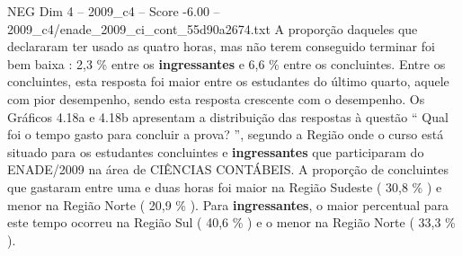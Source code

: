 \begin{textsample}{NEG Dim 4 – 2009\_c4 – Score -6.00 – 2009\_c4/enade\_2009\_ci\_cont\_55d90a2674.txt}
A proporção daqueles que declararam ter usado as quatro horas, mas não terem conseguido terminar foi bem baixa : 2,3 \% entre os \textbf{ingressantes} e 6,6 \% entre os concluintes.
Entre os concluintes, esta resposta foi maior entre os estudantes do último quarto, aquele com pior desempenho, sendo esta resposta crescente com o desempenho.
Os Gráficos 4.18a e 4.18b apresentam a distribuição das respostas à questão “ Qual foi o tempo gasto para concluir a prova? ”, segundo a Região onde o curso está situado para os estudantes concluintes e \textbf{ingressantes} que participaram do ENADE/2009 na área de CIÊNCIAS CONTÁBEIS.
A proporção de concluintes que gastaram entre uma e duas horas foi maior na Região Sudeste ( 30,8 \% ) e menor na Região Norte ( 20,9 \% ).
Para \textbf{ingressantes}, o maior percentual para este tempo ocorreu na Região Sul ( 40,6 \% ) e o menor na Região Norte ( 33,3 \% ).

\end{textsample}
